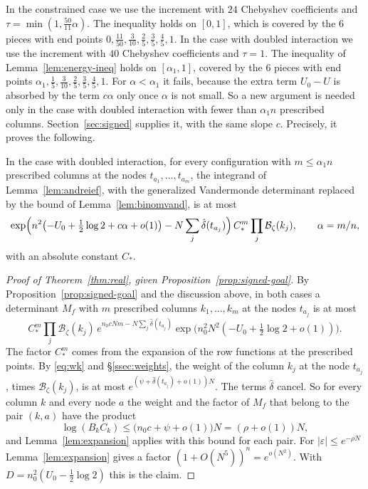 In the constrained case we use the increment with $24$ Chebyshev coefficients and $\tau=\min(1,\frac{50}{11}\alpha)$. The
inequality holds on $[0,1]$, which is covered by the $6$ pieces with end points $0,\frac{11}{50},\frac3{10},\frac25,\frac35,\frac45,1$.
In the case with doubled interaction we use the increment with $40$ Chebyshev coefficients and $\tau=1$. The inequality
of Lemma~\ref{lem:energy-ineq} holds on $[\alpha_1,1]$, covered by the $6$ pieces with end points
$\alpha_1,\frac15,\frac3{10},\frac25,\frac35,\frac45,1$. For $\alpha<\alpha_1$ it fails, because the extra term
$U_0-U$ is absorbed by the term $c\alpha$ only once $\alpha$ is not small. So a new argument is needed only in the case
with doubled interaction with fewer than $\alpha_1n$ prescribed columns. Section~\ref{sec:signed} supplies it, with the
same slope $c$. Precisely, it proves the following.

\begin{proposition}\label{prop:signed-goal}
In the case with doubled interaction, for every configuration with $m\le\alpha_1n$ prescribed columns at the nodes
$t_{a_1},\ldots,t_{a_m}$, the integrand of Lemma~\ref{lem:andreief}, with the generalized Vandermonde determinant replaced by
the bound of Lemma~\ref{lem:binomvand}, is at most
\[
 \exp\Bigl(n^2\bigl(-U_0+\tfrac12\log2+c\alpha+o(1)\bigr)-N\sum_j\hat\delta(t_{a_j})\Bigr)\,C_*^m\prod_j\mathcal B_\zeta(k_j),\qquad \alpha=m/n,
\]
with an absolute constant $C_*$.
\end{proposition}

\begin{proof}[Proof of Theorem~\ref{thm:real}, given Proposition~\ref{prop:signed-goal}]
By Proposition~\ref{prop:signed-goal} and the discussion above, in both cases a determinant $M_f$ with $m$
prescribed columns $k_1,\ldots,k_m$ at the nodes $t_{a_j}$ is at most
\[
 C_*^m\prod_j\mathcal B_\zeta(k_j)\,e^{n_0cNm-N\sum_j\hat\delta(t_{a_j})}\exp\bigl(n_0^2N^2(-U_0+\tfrac12\log2+o(1))\bigr).
\]
The factor $C_*^m$ comes from the expansion of the row functions at the prescribed points. By \eqref{eq:wk} and
\S\ref{ssec:weights}, the weight of the column $k_j$ at the node $t_{a_j}$, times $\mathcal B_\zeta(k_j)$, is at most
$e^{(\psi+\hat\delta(t_{a_j})+o(1))N}$. The terms $\hat\delta$ cancel. So for every column $k$ and every node $a$
the weight and the factor of $M_f$ that belong to the pair $(k,a)$ have the product
\[
 \log(B_kC_k)\le\bigl(n_0c+\psi+o(1)\bigr)N=(\rho+o(1))N ,
\]
and Lemma~\ref{lem:expansion} applies with this bound for each pair.
For $|\varepsilon|\le e^{-\rho N}$ Lemma~\ref{lem:expansion} gives a factor $(1+O(N^5))^n=e^{o(N^2)}$. With
$D=n_0^2(U_0-\frac12\log2)$ this is the claim.
\end{proof}
